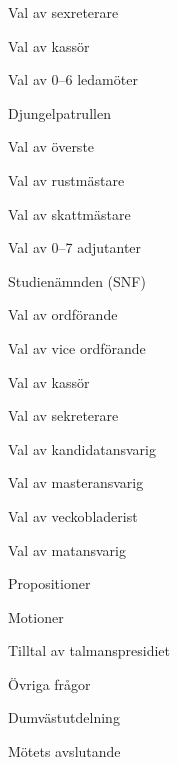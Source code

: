 \documentclass{sektionsmote}
\begin{document}
\begin{ootd}
\begin{ootd}
\begin{ootd}
        \item Val av sexreterare
        \item Val av kassör
        \item Val av 0--6 ledamöter
    \end{ootd}
    \item Djungelpatrullen
    \begin{ootd}
        \item Val av överste
        \item Val av rustmästare
        \item Val av skattmästare
        \item Val av 0--7 adjutanter
    \end{ootd}
    \item Studienämnden (SNF)
    \begin{ootd}
        \item Val av ordförande
        \item Val av vice ordförande
        \item Val av kassör
        \item Val av sekreterare
        \item Val av kandidatansvarig
        \item Val av masteransvarig
        \item Val av veckobladerist
        \item Val av matansvarig
    \end{ootd}
\end{ootd}

\item{Propositioner}

\item{Motioner}
\begin{ootd}
    \item Tilltal av talmanspresidiet
\end{ootd}

\item{Övriga frågor}

\item{Dumvästutdelning}

\item{Mötets avslutande}
\end{ootd}
\end{document}
